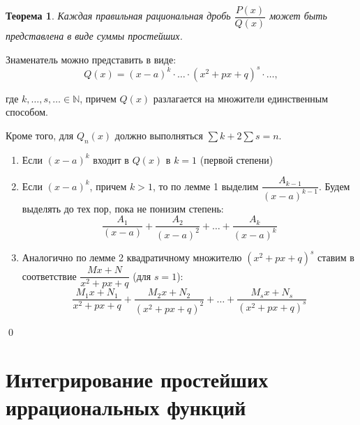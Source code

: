 \documentclass[a4paper,12pt,oneside]{extbook}
\theoremstyle{numbered}
\theoremstyle{unnumbered}
\theoremstyle{named}
\newtheorem{theorem}{Теорема}[section]
\theoremstyle{unnumbered}
\theoremstyle{named}
\theoremstyle{named}
\theoremstyle{named}
\renewenvironment{proof}{{\noindent\textsc{Доказательство.}}}{\qed}
\begin{document}
\begin{theorem}
    Каждая правильная рациональная дробь \(\dfrac{P(x)}{Q(x)}\) может быть представлена в виде суммы простейших.
\end{theorem}

\begin{proof}
    Знаменатель можно представить в виде:
    \[
        Q(x) = (x - a)^k \cdot \ldots \cdot (x^2 + px + q)^s \cdot \ldots,
    \]

    где \(k, \ldots, s, \ldots \in \mathbb{N}\), причем \(Q(x)\) разлагается на множители единственным способом.

    Кроме того, для \(Q_n(x)\) должно выполняться \(\sum k + 2\sum s = n\).

    \begin{enumerate}
        \item {Если \((x - a)^k\) входит в \(Q(x)\) в \(k = 1\) (первой степени)}
        \item {
              Если \((x - a)^k\), причем \(k > 1\), то по лемме 1 выделим \(\dfrac{A_{k - 1}}{(x - a)^{k - 1}}\).
              Будем выделять до тех пор, пока не понизим степень:
              \[
                  \frac{A_1}{(x - a)} + \frac{A_2}{(x - a)^2} + \ldots + \frac{A_k}{(x - a)^k}
              \]
              }
        \item {
              Аналогично по лемме 2 квадратичному множителю \((x^2 + px + q)^s\) ставим в соответствие \(\dfrac{Mx + N}{x^2 + px +q}\) (для \(s = 1\)):
              \[
                  \frac{M_1x + N_1}{x^2 + px + q} + \frac{M_2x + N_2}{(x^2 + px + q)^2} + \ldots + \frac{M_sx + N_s}{(x^2 + px + q)^s}
              \]
              }
    \end{enumerate}
\end{proof}


\section{Интегрирование простейших иррациональных функций}%
\label{sec:Интегрирование простейших иррациональных функций}
\end{document}
